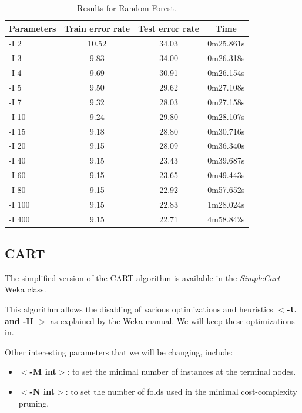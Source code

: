 \documentclass[a4paper]{llncs}
\begin{document}
\begin{table}[ht]
  \begin{center}
  \begin{tabular}{ | l | c | c | c |}
    \hline
    \textbf{Parameters} & \textbf{Train error rate} & \textbf{Test error rate} & \textbf{Time} \\ \hline
    -I 2 & 10.52 & 34.03 & 0m25.861s \\ \hline
    -I 3 & 9.83 & 34.00 & 0m26.318s \\ \hline
    -I 4 & 9.69 & 30.91 & 0m26.154s \\ \hline
    -I 5 & 9.50 & 29.62 & 0m27.108s \\ \hline
    -I 7 & 9.32 & 28.03 & 0m27.158s \\ \hline
    -I 10 & 9.24 & 29.80 & 0m28.107s \\ \hline
    -I 15 & 9.18 & 28.80 & 0m30.716s \\ \hline
    -I 20 & 9.15 & 28.09 & 0m36.340s \\ \hline
    -I 40 & 9.15 & 23.43 & 0m39.687s \\ \hline
    -I 60 & 9.15 & 23.65 & 0m49.443s \\ \hline
    -I 80 & 9.15 & 22.92 & 0m57.652s \\ \hline
    -I 100 & 9.15 & 22.83 & 1m28.024s \\ \hline
    -I 400 & 9.15 & 22.71 & 4m58.842s \\ \hline
  \end{tabular}
  \caption{Results for Random Forest.}
  \label{tbl:results_random_forest}
  \end{center}
\end{table}

\subsection{CART}

The simplified version of the CART algorithm is available
in the \textit{SimpleCart} Weka class.

This algorithm allows the disabling of various optimizations
and heuristics \textbf{$<$-U and -H $>$} as explained by the Weka manual.
We will keep these optimizations in.

Other interesting parameters that we will be changing, include:

\begin{itemize}
  \item \textbf{$<$-M int$>$}: to set the minimal number of instances at the terminal nodes.
  \item \textbf{$<$-N int$>$}: to set the number of folds used in the minimal cost-complexity pruning.
\end{itemize}
\end{document}

